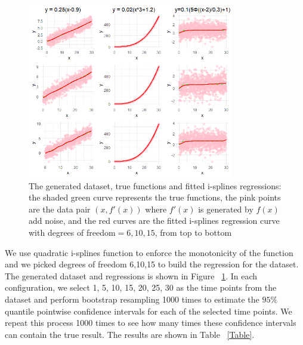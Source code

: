 \documentclass[12pt]{article}
\begin{document}
\begin{figure}[H]
  \centering
  \includegraphics[width=0.8\textwidth]{DataAndRegressions.png}
  \caption{The generated dataset, true functions and fitted i-splines regressions: the shaded green curve represents the true functions, the pink points are the data pair \((x, f'(x))\) where \(f'(x)\) is generated by \(f(x)\) add noise, and the red curves are the fitted i-splines regression curve with degrees of freedom\(= 6,10,15\), from top to bottom}
  \label{fig:DataAndRegressions}
\end{figure}

We use quadratic i-splines function to enforce the monotonicity of the function and we picked degrees of freedom 6,10,15 to build the regression for the dataset. The generated dataset and regressions is shown in Figure ~\ref{fig:DataAndRegressions}. In each configuration, we select 1, 5, 10, 15, 20, 25, 30 as the time points from the dataset and perform bootstrap resampling 1000 times to estimate the \(95\%\) quantile pointwise confidence intervals for each of the selected time points. We repeat this process 1000 times to see how many times these confidence intervals can contain the true result. The results are shown in Table ~\ref{Table}. 
\end{document}
